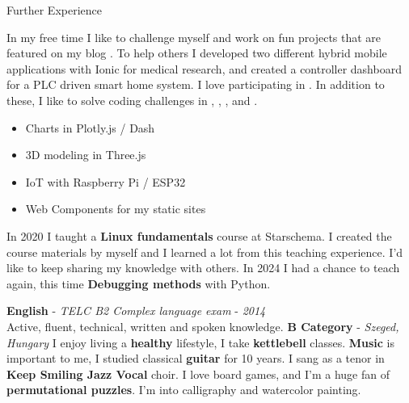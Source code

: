 \customsection
    {Further Experience}
    {\myindent In my free time I like to challenge myself and work on fun projects that are featured on my blog .
    To help others I developed two different hybrid mobile applications with Ionic for medical research,
    and created a controller dashboard for a PLC driven smart home system.
    I love participating in .
    In addition to these, I like to solve coding challenges in
    ,
    ,
    ,
    and .
    \\
    \vspace{-\baselineskip}
        \begin{multicols}{2}
        \begin{itemize}
            \item Charts in Plotly.js / Dash
            \item 3D modeling in Three.js
            \item IoT with Raspberry Pi / ESP32
            \item Web Components for my static sites
        \end{itemize}
        \end{multicols}


    \myindent In 2020 I taught a \textbf{Linux fundamentals} course at Starschema.
    I created the course materials by myself and I learned a lot from this teaching experience.
    I'd like to keep sharing my knowledge with others.
    In 2024 I had a chance to teach again, this time \textbf{Debugging methods} with Python.}
%
    {\textbf{English} - \textit{TELC B2 Complex language exam} - \textit{2014} \\
    \myindent\small{Active, fluent, technical, written and spoken knowledge.}}
%
    {\textbf{B Category} - \textit{Szeged, Hungary}}
%
    {I enjoy living a \textbf{healthy} lifestyle, I take \textbf{kettlebell} classes.
    \textbf{Music} is important to me, I studied classical \textbf{guitar} for 10 years.
    I sang as a tenor in \textbf{Keep Smiling Jazz Vocal} choir.
    I love board games, and I'm a huge fan of \textbf{permutational puzzles}.
    I'm into calligraphy and watercolor painting.}